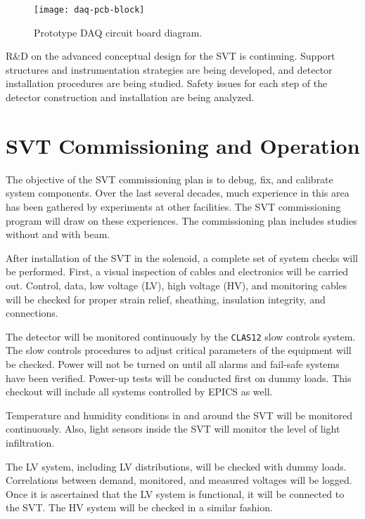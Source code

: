 \begin{figure}[htbp]
\centering
\texttt{[image: daq-pcb-block]}
\caption{\small{Prototype DAQ circuit board diagram.}}
\label{fig:daq-pcb-block}
\end{figure}

R\&D on the advanced conceptual design for the SVT is continuing.  Support 
structures and instrumentation strategies are being developed, and detector 
installation procedures are being studied.  Safety issues for each step of 
the detector construction and installation are being analyzed.

\section{SVT Commissioning and Operation}

The objective of the SVT commissioning plan is to debug, fix, and
calibrate system components.  Over the last several decades, much
experience in this area has been gathered by experiments at other
facilities.  The SVT commissioning program will draw on these experiences.
The commissioning plan includes studies without and with beam.

After installation of the SVT in the solenoid, a complete set of system
checks will be performed.  First, a visual inspection of cables and
electronics will be carried out.  Control, data, low voltage (LV), high
voltage (HV), and monitoring cables will be checked for proper strain relief,
sheathing, insulation integrity, and connections.

The detector will be monitored continuously by the {\tt CLAS12} slow controls
system.  The slow controls procedures to adjust critical parameters of the
equipment will be checked.  Power will not be turned on until all alarms and
fail-safe systems have been verified.  Power-up tests will be conducted first
on dummy loads.  This checkout will include all systems controlled by EPICS
as well.

Temperature and humidity conditions in and around the SVT will be monitored
continuously.  Also, light sensors inside the SVT will monitor the level of
light infiltration.

The LV system, including LV distributions, will be checked with dummy loads.
Correlations between demand, monitored, and measured voltages will be logged.
Once it is ascertained that the LV system is functional, it will be connected
to the SVT.  The HV system will be checked in a similar fashion.


